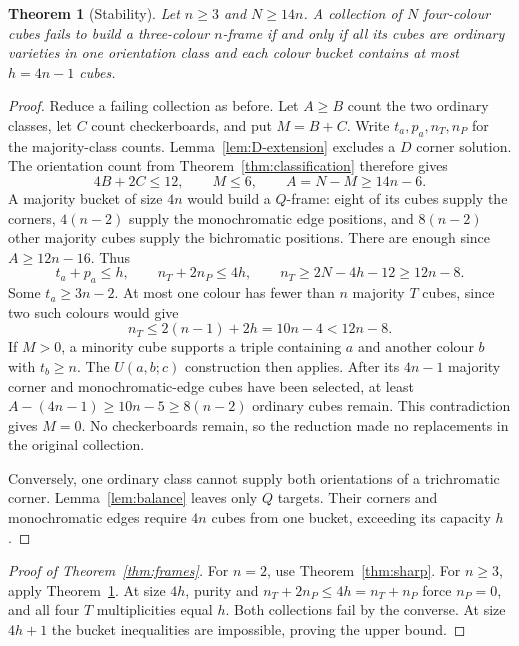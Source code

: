 \documentclass[11pt]{article}
\newtheorem{theorem}{Theorem}
\theoremstyle{remark}
\begin{document}
\begin{theorem}[Stability]\label{thm:stability}
Let $n\ge3$ and $N\ge14n$. A collection of $N$ four-colour cubes fails to
build a three-colour $n$-frame if and only if all its cubes are ordinary
varieties in one orientation class and each colour bucket contains at
most $h=4n-1$ cubes.
\end{theorem}
\begin{proof}
Reduce a failing collection as before. Let $A\ge B$ count the two ordinary
classes, let $C$ count checkerboards, and put $M=B+C$. Write $t_a,p_a,n_T,n_P$
for the majority-class counts. Lemma~\ref{lem:D-extension} excludes a $D$
corner solution. The orientation count from Theorem~\ref{thm:classification}
therefore gives
\[
 4B+2C\le12,\qquad M\le6,\qquad A=N-M\ge14n-6.
\]
A majority bucket of size $4n$ would build a $Q$-frame: eight of its cubes
supply the corners, $4(n-2)$ supply the monochromatic edge positions, and
$8(n-2)$ other majority cubes supply the bichromatic positions. There are
enough since $A\ge12n-16$. Thus
\[
 t_a+p_a\le h,\qquad n_T+2n_P\le4h,\qquad
 n_T\ge2N-4h-12\ge12n-8.
\]
Some $t_a\ge3n-2$. At most one colour has fewer than $n$ majority $T$ cubes,
since two such colours would give
\[
 n_T\le2(n-1)+2h=10n-4<12n-8.
\]
If $M>0$, a minority cube supports a triple containing $a$ and another
colour $b$ with $t_b\ge n$. The $U(a,b;c)$ construction then applies.
After its $4n-1$ majority corner and monochromatic-edge cubes have been
selected, at least $A-(4n-1)\ge10n-5\ge8(n-2)$ ordinary cubes remain.
This contradiction gives $M=0$. No checkerboards remain, so the reduction
made no replacements in the original collection.

Conversely, one ordinary class cannot supply both orientations of a
trichromatic corner. Lemma~\ref{lem:balance} leaves only $Q$ targets.
Their corners and monochromatic edges require $4n$ cubes from one bucket,
exceeding its capacity $h$.
\end{proof}

\begin{proof}[Proof of Theorem~\ref{thm:frames}]
For $n=2$, use Theorem~\ref{thm:sharp}. For $n\ge3$, apply
Theorem~\ref{thm:stability}. At size $4h$, purity and
$n_T+2n_P\le4h=n_T+n_P$ force $n_P=0$, and all four $T$ multiplicities
equal $h$. Both collections fail by the converse. At size $4h+1$ the
bucket inequalities are impossible, proving the upper bound.
\end{proof}
\end{document}
